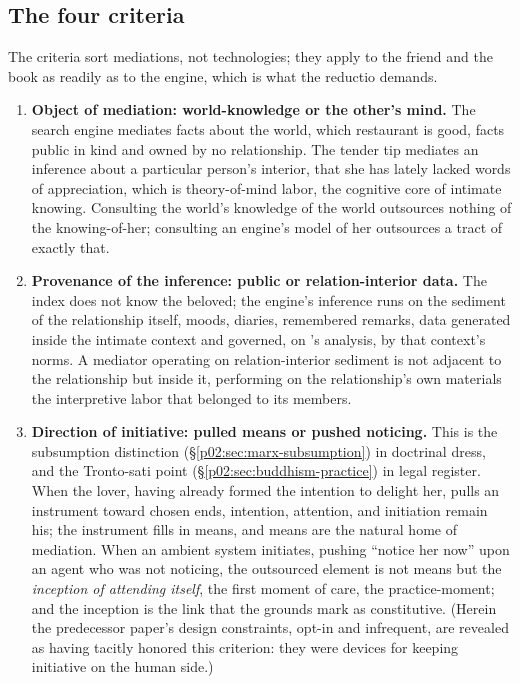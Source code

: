 \documentclass[11pt,a4paper]{article}
\begin{document}
\subsection{The four criteria}
\label{p02:sec:synthesis-criteria}

The criteria sort mediations, not technologies; they apply to the friend and the book as readily as to the engine, which is what the reductio demands.

\begin{enumerate}[leftmargin=2em, itemsep=0.35em]
\item \textbf{Object of mediation: world-knowledge or the other's mind.} The search engine mediates facts about the world, which restaurant is good, facts public in kind and owned by no relationship. The tender tip mediates an inference about a particular person's interior, that she has lately lacked words of appreciation, which is theory-of-mind labor, the cognitive core of intimate knowing. Consulting the world's knowledge of the world outsources nothing of the knowing-of-her; consulting an engine's model of her outsources a tract of exactly that.
\item \textbf{Provenance of the inference: public or relation-interior data.} The index does not know the beloved; the engine's inference runs on the sediment of the relationship itself, moods, diaries, remembered remarks, data generated inside the intimate context and governed, on \textcite{nissenbaum2009privacy}'s analysis, by that context's norms. A mediator operating on relation-interior sediment is not adjacent to the relationship but inside it, performing on the relationship's own materials the interpretive labor that belonged to its members.
\item \textbf{Direction of initiative: pulled means or pushed noticing.} This is the subsumption distinction (\S\ref{p02:sec:marx-subsumption}) in doctrinal dress, and the Tronto-sati point (\S\ref{p02:sec:buddhism-practice}) in legal register. When the lover, having already formed the intention to delight her, pulls an instrument toward chosen ends, intention, attention, and initiation remain his; the instrument fills in means, and means are the natural home of mediation. When an ambient system initiates, pushing ``notice her now'' upon an agent who was not noticing, the outsourced element is not means but the \emph{inception of attending itself}, the first moment of care, the practice-moment; and the inception is the link that the grounds mark as constitutive. (Herein the predecessor paper's design constraints, opt-in and infrequent, are revealed as having tacitly honored this criterion: they were devices for keeping initiative on the human side.)

\end{enumerate}
\end{document}
